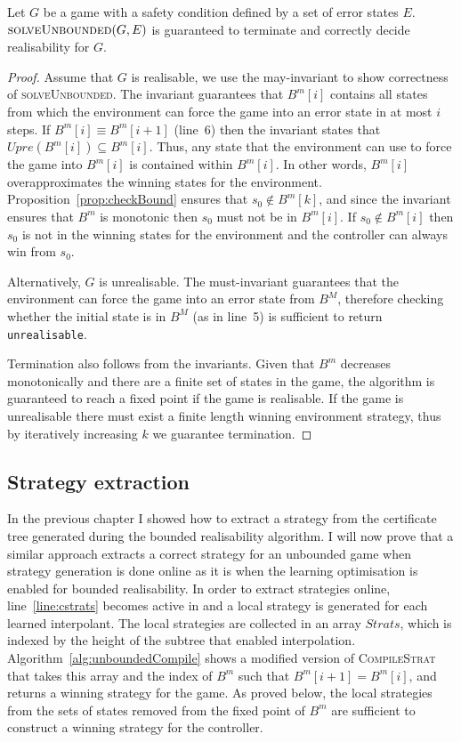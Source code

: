 \begin{theorem}\label{theorem:unboundedcorrectness}
    Let $G$ be a game with a safety condition defined by a set of error states $E$.  $\textsc{solveUnbounded}(G, E)$ is guaranteed to terminate and correctly decide realisability for $G$.
\end{theorem}
\begin{proof}
Assume that $G$ is realisable, we use the may-invariant to show correctness of \textsc{solveUnbounded}.  The invariant guarantees that $B^m[i]$ contains all states from which the environment can force the game into an error state in at most $i$ steps. If $B^m[i] \equiv B^m[i+1]$ (line~6) then the invariant states that $Upre(B^m[i]) \subseteq B^m[i]$. Thus, any state that the environment can use to force the game into $B^m[i]$ is contained within $B^m[i]$. In other words, $B^m[i]$ overapproximates the winning states for the environment.  Proposition~\ref{prop:checkBound} ensures that $s_0 \not\in B^m[k]$, and since the invariant ensures that $B^m$ is monotonic then $s_0$ must not be in $B^m[i]$. If $s_0 \not\in B^m[i]$ then $s_0$ is not in the winning states for the environment and the controller can always win from $s_0$.  

Alternatively, $G$ is unrealisable. The must-invariant guarantees that the environment can force the game into an error state from $B^M$, therefore checking whether the initial state is in $B^M$ (as in line~5) is sufficient to return \texttt{unrealisable}.  

Termination also follows from the invariants. Given that $B^m$ decreases monotonically and there are a finite set of states in the game, the algorithm is guaranteed to reach a fixed point if the game is realisable. If the game is unrealisable there must exist a finite length winning environment strategy, thus by iteratively increasing $k$ we guarantee termination.

\end{proof}

\subsection{Strategy extraction}

In the previous chapter I showed how to extract a strategy from the certificate tree generated during the bounded realisability algorithm. I will now prove that a similar approach extracts a correct strategy for an unbounded game when strategy generation is done online as it is when the learning optimisation is enabled for bounded realisability. In order to extract strategies online, line~\ref{line:cstrats} becomes active in  and a local strategy is generated for each learned interpolant. The local strategies are collected in an array $Strats$, which is indexed by the height of the subtree that enabled interpolation. Algorithm~\ref{alg:unboundedCompile} shows a modified version of \textsc{CompileStrat} that takes this array and the index of $B^m$ such that $B^m[i+1] = B^m[i]$, and returns a winning strategy for the game. As proved below, the local strategies from the sets of states removed from the fixed point of $B^m$ are sufficient to construct a winning strategy for the controller.

